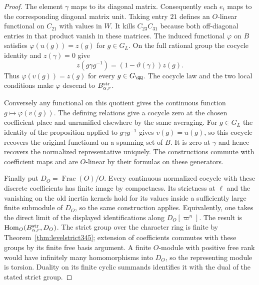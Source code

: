 \documentclass[a4paper,11pt]{article}
\theoremstyle{definition}
\theoremstyle{remark}
\numberwithin{equation}{section}
\begin{document}
\begin{proof}
The element \(\gamma\) maps to its diagonal matrix.
Consequently each \(e_i\) maps to the corresponding diagonal
matrix unit. Taking entry \(21\) defines an \(O\)-linear
functional on \(C_{21}\) with values in \(W\). It kills
\(C_{23}C_{31}\) because both off-diagonal entries in that
product vanish in these matrices. The induced functional
\(\varphi\) on \(B\) satisfies \(\varphi(u(g))=z(g)\)
for \(g\in G_L\). On the full rational group the cocycle
identity and \(z(\gamma)=0\) give
\[
        z(g\gamma g^{-1})=(1-\vartheta(\gamma))z(g).
\]
Thus \(\varphi(v(g))=z(g)\) for every \(g\in G_{\QQ}\).
The cocycle law and the two local conditions make
\(\varphi\) descend to \(B_{\alpha,r}^{\rm str}\).

Conversely any functional on this quotient gives the
continuous function \(g\mapsto\varphi(v(g))\). The defining
relations give a cocycle zero at the chosen coefficient
place and unramified elsewhere by the same averaging.
For \(g\in G_L\) the identity of the proposition applied
to \(g\gamma g^{-1}\) gives \(v(g)=u(g)\), so this cocycle
recovers the original functional on a spanning set of
\(B\). It is zero at \(\gamma\) and hence recovers the
normalized representative uniquely. The constructions
commute with coefficient maps and are \(O\)-linear by
their formulas on these generators.

Finally put \(D_O=\operatorname{Frac}(O)/O\). Every
continuous normalized cocycle with these discrete
coefficients has finite image by compactness. Its
strictness at \(\ell\) and the vanishing on the old inertia
kernels hold for its values inside a sufficiently large
finite submodule of \(D_O\), so the same construction
applies. Equivalently, one takes the direct limit of the
displayed identifications along \(D_O[\varpi^n]\). The
result is \(\operatorname{Hom}_O(B_{\alpha,r}^{\rm str},D_O)\).
The strict group over the character ring is finite by
Theorem~\ref{thm:levelstrict345}; extension of coefficients
commutes with these groups by its finite free basis argument.
A finite \(O\)-module with positive free rank would have
infinitely many homomorphisms into \(D_O\), so the
representing module is torsion. Duality on its finite
cyclic summands identifies it with the dual of the
stated strict group.
\end{proof}
\end{document}
